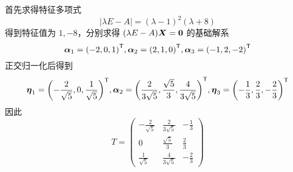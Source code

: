 \begin{solution}
	首先求得特征多项式
	\[ |\lambda E - A| = (\lambda-1)^2(\lambda+8) \]
	得到特征值为 $1, -8$，分别求得 $(\lambda E - A) \boldsymbol{X} = \boldsymbol{0}$ 的基础解系
	\[ \boldsymbol{\alpha}_1 = {(-2, 0, 1)}^\mathsf{T}, \boldsymbol{\alpha}_2 = {(2, 1, 0)}^\mathsf{T}, \boldsymbol{\alpha}_3 = {(-1, 2, -2)}^\mathsf{T} \]
	正交归一化后得到
	\[ \boldsymbol{\eta}_1 = {\left(-\frac{2}{\sqrt{5}}, 0, \frac{1}{\sqrt{5}}\right)}^\mathsf{T}, \boldsymbol{\alpha}_2 = {\left(\frac{2}{3\sqrt{5}}, \frac{\sqrt{5}}{3}, \frac{4}{3 \sqrt{5}}\right)}^\mathsf{T}, \boldsymbol{\eta}_3 = {\left(-\frac{1}{3}, \frac{2}{3}, -\frac{2}{3}\right)}^\mathsf{T} \]
	因此
	\[ T = \left(\begin{matrix}
				-\frac{2}{\sqrt{5}} & \frac{2}{3\sqrt{5}}  & -\frac{1}{3} \\ 
				0                   & \frac{\sqrt{5}}{3}   & \frac{2}{3}  \\
				\frac{1}{\sqrt{5}}  & \frac{4}{3 \sqrt{5}} & -\frac{2}{3}
			\end{matrix}\right) \]
\end{solution}
